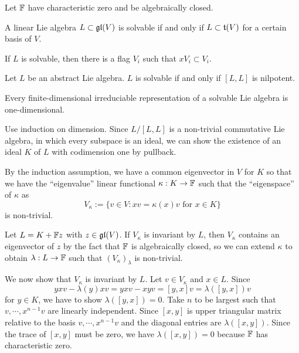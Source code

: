 \documentclass{../../large}
\begin{document}
\begin{prb}
Let $\mathbb{F}$ have characteristic zero and be algebraically closed.
\begin{parts}
\item A linear Lie algebra $L\subset\mathfrak{gl}(V)$ is solvable if and only if $L\subset\mathfrak{t}(V)$ for a certain basis of $V$.
\item If $L$ is solvable, then there is a flag $V_i$ such that $xV_i\subset V_i$.
\item Let $L$ be an abstract Lie algebra. $L$ is solvable if and only if $[L,L]$ is nilpotent.
\item Every finite-dimensional irreduciable representation of a solvable Lie algebra is one-dimensional.
\end{parts}
\end{prb}
\begin{pf}
Use induction on dimension.
Since $L/[L,L]$ is a non-trivial commutative Lie algebra, in which every subspace is an ideal, we can show the existence of an ideal $K$ of $L$ with codimension one by pullback.

By the induction assumption, we have a common eigenvector in $V$ for $K$ so that we have the ``eigenvalue'' linear functional $\kappa:K\to\mathbb{F}$ such that the ``eigenspace'' of $\kappa$ as
\[V_\kappa:=\{v\in V:xv=\kappa(x)v\text{ for }x\in K\}\]
is non-trivial.

Let $L=K+\mathbb{F} z$ with $z\in\mathfrak{gl}(V)$.
If $V_\kappa$ is invariant by $L$, then $V_\kappa$ contains an eigenvector of $z$ by the fact that $\mathbb{F}$ is algebraically closed, so we can extend $\kappa$ to obtain $\lambda:L\to\mathbb{F}$ such that $(V_\kappa)_\lambda$ is non-trivial.

We now show that $V_\kappa$ is invariant by $L$.
Let $v\in V_\kappa$ and $x\in L$.
Since
\[yxv-\lambda(y)xv=yxv-xyv=[y,x]v=\lambda([y,x])v\]
for $y\in K$, we have to show $\lambda([y,x])=0$.
Take $n$ to be largest such that $v,\cdots,x^{n-1}v$ are linearly independent.
Since $[x,y]$ is upper triangular matrix relative to the basis $v,\cdots,x^{n-1}v$ and the diagonal entries are $\lambda([x,y])$.
Since the trace of $[x,y]$ must be zero, we have $\lambda([x,y])=0$ because $\mathbb{F}$ has characteristic zero.

\end{pf}

\begin{prb}



\end{prb}
\end{document}
